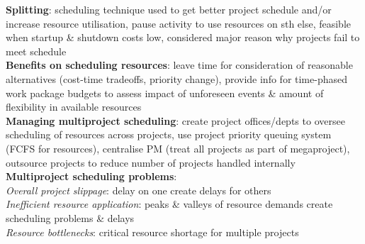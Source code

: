 \documentclass[a4paper]{article}
\begin{document}
\begin{multicols}{3}
        \textbf{Splitting}: scheduling technique used to get better project schedule and/or increase resource utilisation, pause activity to use resources on sth else, feasible when startup \& shutdown costs low, considered major reason why projects fail to meet schedule\\
        \textbf{Benefits on scheduling resources}: leave time for consideration of reasonable alternatives (cost-time tradeoffs, priority change), provide info for time-phased work package budgets to assess impact of unforeseen events \& amount of flexibility in available resources\\
        \textbf{Managing multiproject scheduling}: create project offices/depts to oversee scheduling of resources across projects, use project priority queuing system (FCFS for resources), centralise PM (treat all projects as part of megaproject), outsource projects to reduce number of projects handled internally\\
        \textbf{Multiproject scheduling problems}:\\
        \textit{Overall project slippage}: delay on one create delays for others\\
        \textit{Inefficient resource application}: peaks \& valleys of resource demands create scheduling problems \& delays\\
        \textit{Resource bottlenecks}: critical resource shortage for multiple projects\\
    \end{multicols}
    
\end{document}
